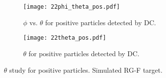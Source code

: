     \begin{figure}
        \centering
        \begin{subfigure}[b]{\textwidth}
            \centering
            \texttt{[image: 22phi\_theta\_pos.pdf]}
            \caption[$\phi$ vs. $\theta$ for positive particles]
            {$\phi$ vs. $\theta$ for positive particles detected by DC.}
            \label{fig::14.22::phi_theta_pos}
        \end{subfigure}
        \begin{subfigure}[b]{\textwidth}
            \centering
            \texttt{[image: 22theta\_pos.pdf]}
            \caption[$\theta$ for positive particles]
            {$\theta$ for positive particles detected by DC.}
            \label{fig::14.22::theta_pos}
        \end{subfigure}
        \caption[$\theta$ study for positive particles]
        {$\theta$ study for positive particles.
        Simulated RG-F target.}
        \label{fig::14.22::theta_study_pos}
    \end{figure}
